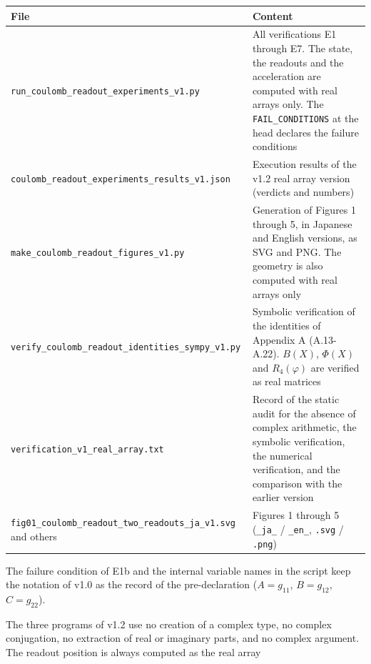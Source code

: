 \documentclass[
  a4paper,
]{article}
\newcounter{none} %
\begin{document}
{\def\LTcaptype{none} %
\begin{longtable}[]{@{}
  >{\raggedright\arraybackslash}p{}
  >{\raggedright\arraybackslash}p{}@{}}
\toprule\noalign{}
\begin{minipage}[b]{\linewidth}\raggedright
File
\end{minipage} & \begin{minipage}[b]{\linewidth}\raggedright
Content
\end{minipage} \\
\midrule\noalign{}
\endhead
\bottomrule\noalign{}
\endlastfoot
\texttt{run\_coulomb\_readout\_experiments\_v1.py} & All verifications
E1 through E7. The state, the readouts and the acceleration are computed
with real arrays only. The \texttt{FAIL\_CONDITIONS} at the head
declares the failure conditions \\
\texttt{coulomb\_readout\_experiments\_results\_v1.json} & Execution
results of the v1.2 real array version (verdicts and numbers) \\
\texttt{make\_coulomb\_readout\_figures\_v1.py} & Generation of Figures
1 through 5, in Japanese and English versions, as SVG and PNG. The
geometry is also computed with real arrays only \\
\texttt{verify\_coulomb\_readout\_identities\_sympy\_v1.py} & Symbolic
verification of the identities of Appendix A (A.13-A.22). \(B(X)\),
\(\Phi(X)\) and \(R_4(\varphi)\) are verified as real matrices \\
\texttt{verification\_v1\_real\_array.txt} & Record of the static audit
for the absence of complex arithmetic, the symbolic verification, the
numerical verification, and the comparison with the earlier version \\
\texttt{fig01\_coulomb\_readout\_two\_readouts\_ja\_v1.svg} and others &
Figures 1 through 5 (\texttt{\_ja\_} / \texttt{\_en\_}, \texttt{.svg} /
\texttt{.png}) \\
\end{longtable}
}

The failure condition of E1b and the internal variable names in the
script keep the notation of v1.0 as the record of the pre-declaration
(\(A=g_{11}\), \(B=g_{12}\), \(C=g_{22}\)).

The three programs of v1.2 use no creation of a complex type, no complex
conjugation, no extraction of real or imaginary parts, and no complex
argument. The readout position is always computed as the real array
\end{document}
